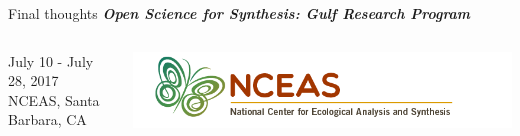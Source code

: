 \documentclass[serif]{beamer}\usepackage[]{graphicx}\usepackage[]{color}
\newcommand{\emtxt}[1]{\textbf{\textit{#1}}}
\begin{document}
\begin{frame}[t]{Final thoughts}{}
{\large \emtxt{Open Science for Synthesis: Gulf Research Program}}
\begin{columns}
\begin{column}{0.5\textwidth}
July 10 - July 28, 2017\\
NCEAS, Santa Barbara, CA 
\end{column}
\begin{column}{0.5\textwidth}
\hfill \includegraphics[width = \textwidth]{fig/nceas_full.png}
\end{column}
\end{columns}
\vspace{0.1in}
\begin{columns}
\begin{column}{0.5\textwidth}
\centerline{}
\end{column}
\begin{column}{0.5\textwidth}
\centerline{}
\end{column}
\end{columns}
\end{frame}
\end{document}
